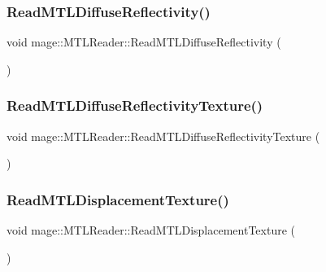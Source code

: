 \subsubsection{\texorpdfstring{Read\+M\+T\+L\+Diffuse\+Reflectivity()}{ReadMTLDiffuseReflectivity()}}
{\footnotesize\ttfamily void mage\+::\+M\+T\+L\+Reader\+::\+Read\+M\+T\+L\+Diffuse\+Reflectivity (\begin{DoxyParamCaption}{ }\end{DoxyParamCaption})\hspace{0.3cm}{\ttfamily [private]}}

\hypertarget{classmage_1_1_m_t_l_reader_ad941332bf48f9fd9f7c4cecf5ae6ccc4}{}\label{classmage_1_1_m_t_l_reader_ad941332bf48f9fd9f7c4cecf5ae6ccc4} 
\subsubsection{\texorpdfstring{Read\+M\+T\+L\+Diffuse\+Reflectivity\+Texture()}{ReadMTLDiffuseReflectivityTexture()}}
{\footnotesize\ttfamily void mage\+::\+M\+T\+L\+Reader\+::\+Read\+M\+T\+L\+Diffuse\+Reflectivity\+Texture (\begin{DoxyParamCaption}{ }\end{DoxyParamCaption})\hspace{0.3cm}{\ttfamily [private]}}

\hypertarget{classmage_1_1_m_t_l_reader_a9d4f8dea5a5582c5e7b788149110800c}{}\label{classmage_1_1_m_t_l_reader_a9d4f8dea5a5582c5e7b788149110800c} 
\subsubsection{\texorpdfstring{Read\+M\+T\+L\+Displacement\+Texture()}{ReadMTLDisplacementTexture()}}
{\footnotesize\ttfamily void mage\+::\+M\+T\+L\+Reader\+::\+Read\+M\+T\+L\+Displacement\+Texture (\begin{DoxyParamCaption}{ }\end{DoxyParamCaption})\hspace{0.3cm}{\ttfamily [private]}}

